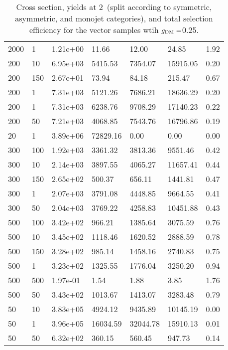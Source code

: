 \begin{table}
\begin{tabular}{lllllll}
2000      &   1         &   1.21e+00  &   11.66     &   12.00     &   24.85     &   1.92      \\ 
200       &   10        &   6.95e+03  &   5415.53   &   7354.07   &   15915.05  &   0.20      \\ 
200       &   150       &   2.67e+01  &   73.94     &   84.18     &   215.47    &   0.67      \\ 
200       &   1         &   7.31e+03  &   5121.26   &   7686.21   &   18636.29  &   0.20      \\ 
200       &   1         &   7.31e+03  &   6238.76   &   9708.29   &   17140.23  &   0.22      \\ 
200       &   50        &   7.21e+03  &   4068.85   &   7543.76   &   16796.86  &   0.19      \\ 
20        &   1         &   3.89e+06  &   72829.16  &   0.00      &   0.00      &   0.00      \\ 
300       &   100       &   1.92e+03  &   3361.32   &   3813.36   &   9551.46   &   0.42      \\ 
300       &   10        &   2.14e+03  &   3897.55   &   4065.27   &   11657.41  &   0.44      \\ 
300       &   150       &   2.65e+02  &   500.37    &   656.11    &   1441.81   &   0.47      \\ 
300       &   1         &   2.07e+03  &   3791.08   &   4448.85   &   9664.55   &   0.41      \\ 
300       &   50        &   2.04e+03  &   3769.22   &   4258.83   &   10451.88  &   0.43      \\ 
500       &   100       &   3.42e+02  &   966.21    &   1385.64   &   3075.59   &   0.76      \\ 
500       &   10        &   3.45e+02  &   1118.46   &   1620.52   &   2888.59   &   0.78      \\ 
500       &   150       &   3.28e+02  &   985.14    &   1458.16   &   2740.83   &   0.75      \\ 
500       &   1         &   3.23e+02  &   1325.55   &   1776.04   &   3250.20   &   0.94      \\ 
500       &   500       &   1.97e-01  &   1.54      &   1.88      &   3.85      &   1.76      \\ 
500       &   50        &   3.43e+02  &   1013.67   &   1413.07   &   3283.48   &   0.79      \\ 
50        &   10        &   3.83e+05  &   4924.12   &   9435.89   &   10145.19  &   0.00      \\ 
50        &   1         &   3.96e+05  &   16034.59  &   32044.78  &   15910.13  &   0.01      \\ 
50        &   50        &   6.32e+02  &   360.15    &   560.45    &   947.73    &   0.14      \\ 
\hline
\end{tabular}
\caption{Cross section, yields at 2~\ifb (split according to symmetric, asymmetric, and monojet categories), and total selection efficiency for the vector \DMj samples wtih $g_{\rm DM}=$0.25.}
\label{summaryTableAN_DMV_xs10_g0p25_2p1fb_exp}
\end{table}
